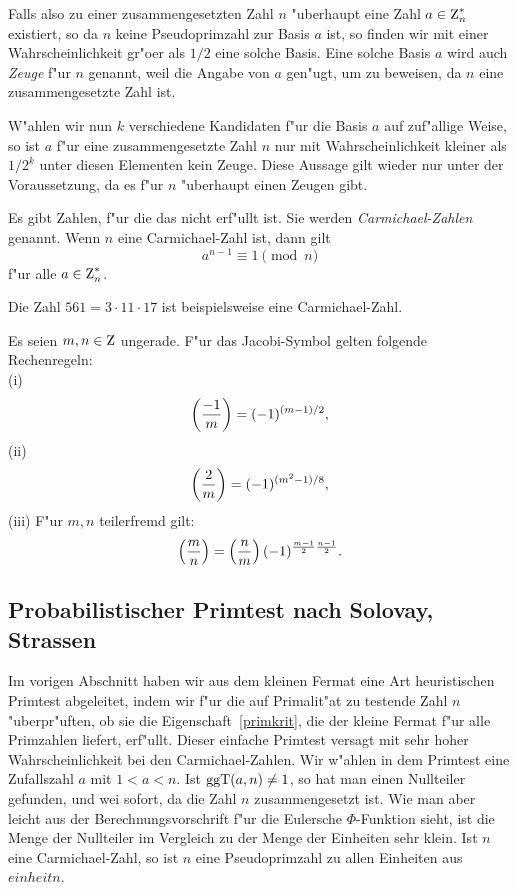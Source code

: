 Falls also zu einer zusammengesetzten Zahl $n$ "uberhaupt eine Zahl
$a\in\einheit{n}$ existiert, so da\3 $n$ keine Pseudoprimzahl zur
Basis $a$ ist, so finden wir mit einer Wahrscheinlichkeit gr"o\3er als
$1/2$ eine solche Basis. Eine solche Basis $a$ wird auch {\em Zeuge}
f"ur $n$ genannt, weil die Angabe von $a$ gen"ugt, um zu beweisen,
da\3 $n$ eine zusammengesetzte Zahl ist.

W"ahlen wir nun $k$ verschiedene Kandidaten f"ur die Basis $a$ auf
zuf"allige Weise, so ist $a$ f"ur eine zusammengesetzte Zahl $n$ nur mit
Wahrscheinlichkeit kleiner als $1/2^{k}$ unter diesen Elementen kein
Zeuge. Diese Aussage gilt wieder nur unter der Voraussetzung, da\3 es
f"ur $n$ "uberhaupt einen Zeugen gibt.

Es gibt Zahlen, f"ur die das nicht erf"ullt ist. Sie werden {\em
Carmichael-Zahlen} genannt. Wenn $n$ eine Carmichael-Zahl ist, dann
gilt
$$ a^{n-1} \equiv 1 \pmod{n}$$ f"ur alle $a\in\einheit{n}$.

Die Zahl $561=3\cdot 11\cdot 17$ ist beispielsweise eine Carmichael-Zahl.

\begin{satz}
  Es seien $m,n\in\Z$ ungerade. F"ur das Jacobi-Symbol gelten folgende
  Rechenregeln: \\
  (i)   $$ \left(\frac{-1}{m}\right) = (-1)^{(m-1)/2}, $$
  (ii)  $$ \left(\frac{2}{m}\right) = (-1)^{(m^2-1)/8}, $$
  (iii) F"ur $m,n$ teilerfremd gilt:
  $$ \left(\frac{m}{n}\right) = \left(\frac{n}{m}\right) (-1)^{\frac{m-1}{2}\frac{n-1}{2}}. $$
\end{satz}


\subsection{Probabilistischer Primtest nach Solovay, Strassen}

Im vorigen Abschnitt haben wir aus dem kleinen Fermat eine Art
heuristischen Primtest abgeleitet, indem wir f"ur die auf Primalit"at
zu testende Zahl $n$ "uberpr"uften, ob sie die Eigenschaft~\ref{primkrit}, die der
kleine Fermat f"ur alle Primzahlen liefert, erf"ullt. Dieser einfache
Primtest versagt mit sehr hoher Wahrscheinlichkeit bei den
Carmichael-Zahlen. Wir w"ahlen in dem Primtest eine Zufallszahl $a$ mit
$1 < a < n$. Ist $\mbox{ggT}(a,n)\neq 1$, so hat man einen Nullteiler
gefunden, und wei\3 sofort, da\3 die Zahl $n$ zusammengesetzt ist. Wie
man aber leicht aus der Berechnungsvorschrift f"ur die Eulersche
$\Phi$-Funktion sieht, ist die Menge der Nullteiler im Vergleich zu
der Menge der Einheiten sehr klein. Ist $n$ eine Carmichael-Zahl, so
ist $n$ eine Pseudoprimzahl zu allen Einheiten aus $einheit{n}$.

